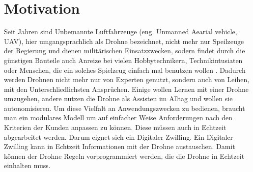 \section{Motivation}

Seit Jahren sind Unbemannte Luftfahrzeuge (eng. Unmanned Aearial vehicle, UAV), hier umgangsprachlich als Drohne bezeichnet, nicht mehr nur Speilzeuge der Regierung und dienen militärischen Einsatzzwecken, sodern findet durch die günstigen Bauteile auch Anreize bei vielen Hobbytechnikern, Technikintusiaten oder Menschen, die ein solches Spielzeug einfach mal benutzen wollen \cite{Gadiraju2021Understanding}. Dadurch werden Drohnen nicht mehr nur von Experten genutzt, sondern auch von Leihen, mit den Unterschliedlichsten Ansprüchen. Einige wollen Lernen mit einer Drohne umzugehen, andere nutzen die Drohne als Assisten im Alltag und wollen sie autonomisieren. Um diese Vielfalt an Anwendungszwecken zu bedienen, braucht man ein modulares Modell um auf einfacher Weise Anforderungen nach den Kriterien der Kunden anpassen zu können. Diese müssen auch in Echtzeit abgearbeitet werden. Darum eignet sich ein Digitaler Zwilling. Ein Digitaler Zwilling kann in Echtzeit Informationen mit der Drohne austauschen. Damit können der Drohne Regeln vorprogrammiert werden, die die Drohne in Echtzeit einhalten muss. 